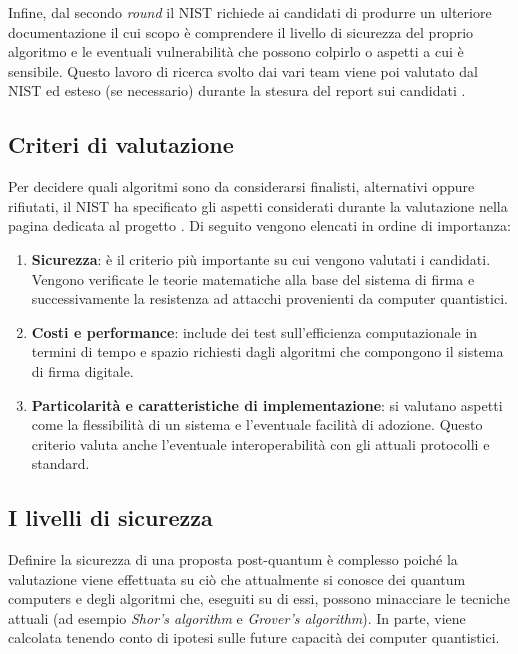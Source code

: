 Infine, dal secondo \textit{round} il NIST richiede ai candidati di produrre un ulteriore documentazione il cui scopo è comprendere il livello di sicurezza del proprio algoritmo e le eventuali vulnerabilità che possono colpirlo o aspetti a cui è sensibile. Questo lavoro di ricerca svolto dai vari team viene poi valutato dal NIST ed esteso (se necessario) durante la stesura del report sui candidati \cite{NISTevaluationCriteria}.

\subsection{Criteri di valutazione}

Per decidere quali algoritmi sono da considerarsi finalisti, alternativi oppure rifiutati, il NIST ha specificato gli aspetti considerati durante la valutazione nella pagina dedicata al progetto \cite{NISTevaluationCriteria}. Di seguito vengono elencati in ordine di importanza:
\begin{enumerate}
    \item \textbf{Sicurezza}: è il criterio più importante su cui vengono valutati i candidati. Vengono verificate le teorie matematiche alla base del sistema di firma e successivamente la resistenza ad attacchi provenienti da computer quantistici.
    \item \textbf{Costi e performance}: include dei test sull'efficienza computazionale in termini di tempo e spazio richiesti dagli algoritmi che compongono il sistema di firma digitale.
    \item \textbf{Particolarità e caratteristiche di implementazione}: si valutano aspetti come la flessibilità di un sistema e l'eventuale facilità di adozione. Questo criterio valuta anche l'eventuale interoperabilità con gli attuali protocolli e standard.
\end{enumerate}

\subsection{I livelli di sicurezza}

Definire la sicurezza di una proposta post-quantum è complesso poiché la valutazione viene effettuata su ciò che attualmente si conosce dei quantum computers e degli algoritmi che, eseguiti su di essi, possono minacciare le tecniche attuali (ad esempio \textit{Shor's algorithm} e \textit{Grover's algorithm}). In parte, viene calcolata tenendo conto di ipotesi sulle future capacità dei computer quantistici.

